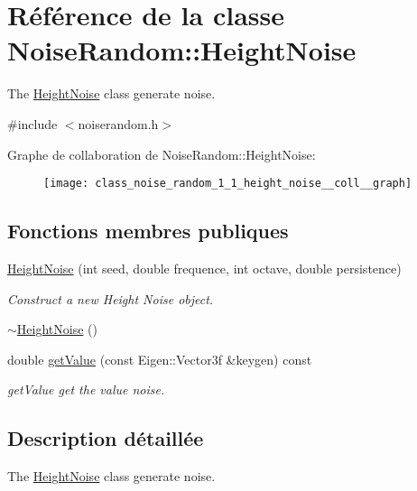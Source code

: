 \hypertarget{class_noise_random_1_1_height_noise}{}\section{Référence de la classe Noise\+Random\+:\+:Height\+Noise}
\label{class_noise_random_1_1_height_noise}


The \hyperlink{class_noise_random_1_1_height_noise}{Height\+Noise} class generate noise.  




{\ttfamily \#include $<$noiserandom.\+h$>$}



Graphe de collaboration de Noise\+Random\+:\+:Height\+Noise\+:\nopagebreak
\begin{figure}[H]
\begin{center}
\leavevmode
\texttt{[image: class\_noise\_random\_1\_1\_height\_noise\_\_coll\_\_graph]}
\end{center}
\end{figure}
\subsection*{Fonctions membres publiques}
\begin{DoxyCompactItemize}
\item 
\hyperlink{class_noise_random_1_1_height_noise_ab166c1a0af9e801a289d33a6d7bd2292}{Height\+Noise} (int seed, double frequence, int octave, double persistence)
\begin{DoxyCompactList}\small\item\em Construct a new Height Noise object. \end{DoxyCompactList}\item 
\hyperlink{class_noise_random_1_1_height_noise_a85d91613d7cc310e928f136680afff22}{$\sim$\+Height\+Noise} ()
\item 
double \hyperlink{class_noise_random_1_1_height_noise_a2fd30f88b20ba463d156c210ef08d54e}{get\+Value} (const Eigen\+::\+Vector3f \&keygen) const
\begin{DoxyCompactList}\small\item\em get\+Value get the value noise. \end{DoxyCompactList}\end{DoxyCompactItemize}


\subsection{Description détaillée}
The \hyperlink{class_noise_random_1_1_height_noise}{Height\+Noise} class generate noise. 

